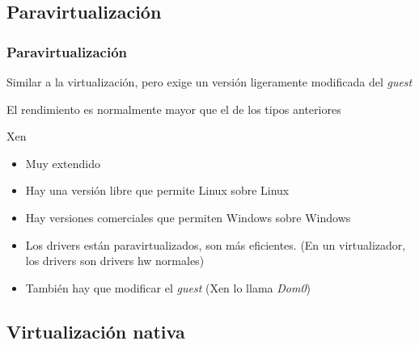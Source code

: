 \documentclass[ucs]{beamer}
\begin{document}
\subsection{Paravirtualización}

\begin{frame}[fragile]
\frametitle{Paravirtualización}


Similar a la virtualización, pero
exige un versión ligeramente modificada del \emph{guest}

El rendimiento es normalmente mayor que el de los tipos anteriores

Xen

\begin{itemize}	
\item
Muy extendido
\item
Hay una versión libre que permite Linux sobre Linux
\item
Hay versiones comerciales que permiten Windows sobre Windows
\item
Los drivers están paravirtualizados, son más eficientes.
(En un virtualizador, los drivers son drivers hw normales)
\item
También hay que modificar el \emph{guest} (Xen lo llama \emph{Dom0})

\end{itemize}	

\end{frame}

\subsection{Virtualización nativa}
\end{document}
